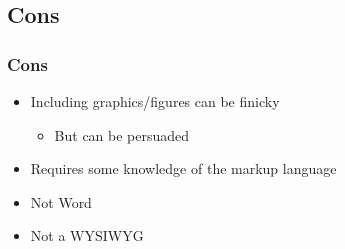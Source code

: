 \subsection{Cons}

\begin{frame}
\frametitle{Cons}
    \begin{itemize}
        \item Including graphics/figures can be finicky
        \begin{itemize}
            \item But can be persuaded
        \end{itemize}
        \item Requires some knowledge of the markup language
        \item Not Word
        \item Not a WYSIWYG
    \end{itemize}
\end{frame}



